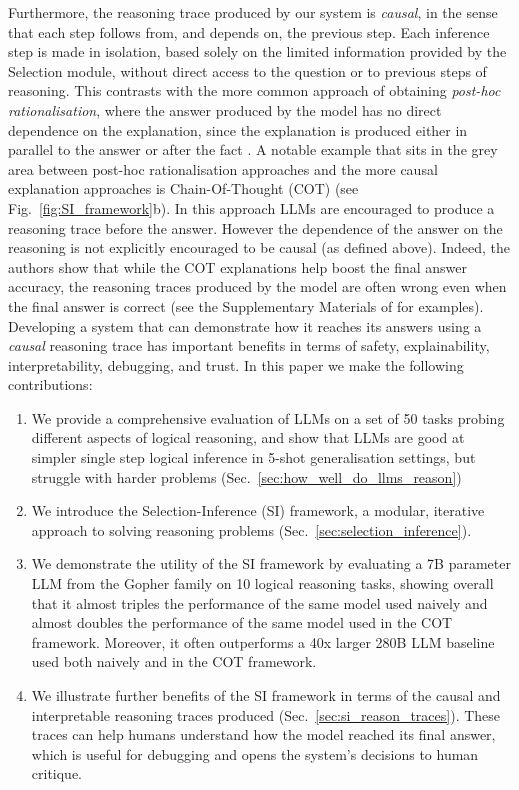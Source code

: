 Furthermore, the reasoning trace produced by our system is \emph{causal}, in the sense that each step follows from, and depends on, the previous step. Each inference step is made in isolation, based solely on the limited information provided by the Selection module, without direct access to the question or to previous steps of reasoning. This contrasts with the more common approach of obtaining \emph{post-hoc rationalisation}, where the answer produced by the model has no direct dependence on the explanation, since the explanation is produced either in parallel to the answer or after the fact \citep{saha2020prover, lampinen2021tell, cobbe2021training}. A notable example that sits in the grey area between post-hoc rationalisation approaches and the more causal explanation approaches is Chain-Of-Thought (COT) \citep{wei2022chain} (see Fig.~\ref{fig:SI_framework}b). In this approach LLMs are encouraged to produce a reasoning trace before the answer. However the dependence of the answer on the reasoning is not explicitly encouraged to be causal (as defined above). Indeed, the authors show that while the COT explanations help boost the final answer accuracy, the reasoning traces produced by the model are often wrong even when the final answer is correct (see the Supplementary Materials of \citep{wei2022chain} for examples). Developing a system that can demonstrate how it reaches its answers using a \emph{causal} reasoning trace has important benefits in terms of safety, explainability, interpretability, debugging, and trust. In this paper we make the following contributions:

\begin{enumerate}
    \item We provide a comprehensive evaluation of LLMs on a set of 50  tasks probing different aspects of logical reasoning, and show that LLMs are good at simpler single step logical inference in 5-shot generalisation settings, but struggle with harder problems (Sec.~\ref{sec:how_well_do_llms_reason})
    \item We introduce the Selection-Inference (SI) framework, a modular, iterative approach to solving reasoning problems (Sec.~\ref{sec:selection_inference}).
    \item We demonstrate the utility of the SI framework by evaluating a 7B parameter LLM from the Gopher family \citep{rae2021scaling} on 10  logical reasoning tasks, showing overall that it almost triples the performance of the same model used naively and almost doubles the performance of the same model used in the COT framework. Moreover, it often outperforms a 40x larger 280B LLM baseline used both naively and in the COT framework. 
    \item We illustrate further benefits of the SI framework in terms of the causal and interpretable reasoning traces produced (Sec.~\ref{sec:si_reason_traces}). These traces can help humans understand how the model reached its final answer, which is useful for debugging and opens the system's decisions to human critique.
\end{enumerate}

